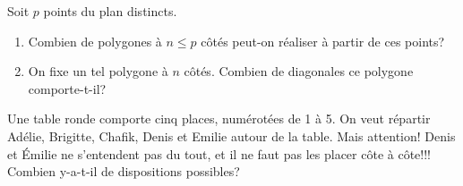 \documentclass[../PolyS4.tex]{subfiles}
\begin{document}



Soit $p$ points du plan distincts.
\begin{enumerate}
\item Combien de polygones à $n\leq p$ côtés peut-on réaliser à partir de ces points? 
\item On fixe un tel polygone à $n$ côtés. Combien de diagonales ce polygone comporte-t-il?\\
\end{enumerate}



\newpage
{}

Une table ronde comporte cinq places, numérotées de 1 à 5. On veut répartir Adélie, Brigitte, Chafik, Denis et Emilie autour de la table. Mais attention! Denis et \'Emilie ne s'entendent pas du tout, et il ne faut pas les placer côte à côte!!! Combien y-a-t-il de dispositions possibles?\\






\end{document}
